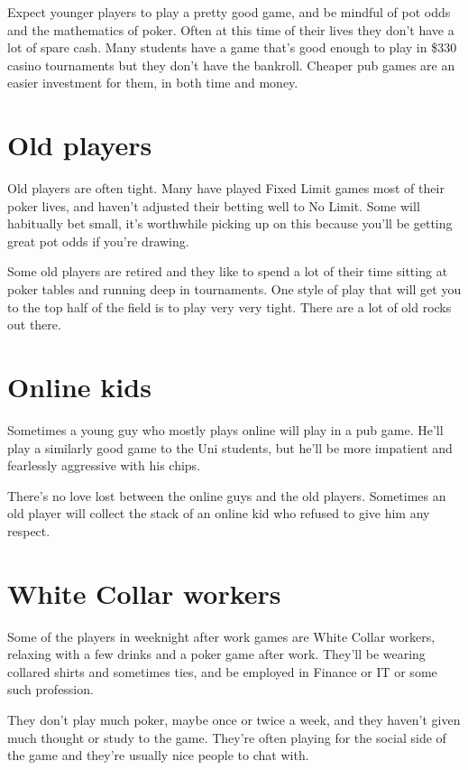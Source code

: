Expect younger players to play a pretty good game, and be mindful of pot
odds and the mathematics of poker. Often at this time of their lives
they don't have a lot of spare cash. Many students have a game that's
good enough to play in \$330 casino tournaments but they don't have
the bankroll. Cheaper pub games are an easier investment for them,
in both time and money.

\section{Old players}

Old players are often tight. Many have played Fixed Limit games most
of their poker lives, and haven't adjusted their betting well to No
Limit. Some will habitually bet small, it's worthwhile picking up on
this because you'll be getting great pot odds if you're drawing.

Some old players are retired and they like to spend a lot of their
time sitting at poker tables and running deep in tournaments. One
style of play that will get you to the top half of the field is to
play very very tight. There are a lot of old rocks out there.

\section{Online kids}

Sometimes a young guy who mostly plays online will play in a pub game.
He'll play a similarly good game to the Uni students, but he'll be
more impatient and fearlessly aggressive with his chips.

There's no love lost between the online guys and the old players. Sometimes
an old player will collect the stack of an online kid who refused to
give him any respect.

\section{White Collar workers}

Some of the players in weeknight after work games are White
Collar workers, relaxing with a few drinks and a poker game after work.
They'll be wearing collared shirts and sometimes ties, and be employed
in Finance or IT or some such profession.

They don't play much poker, maybe once or twice a week, and they haven't
given much thought or study to the game. They're often playing for the
social side of the game and they're usually nice people to chat with.

